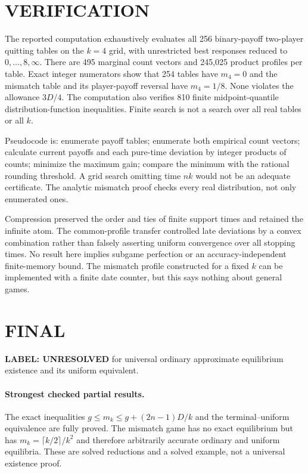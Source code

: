 \documentclass[11pt,a4paper]{article}
\theoremstyle{definition}
\theoremstyle{remark}
\begin{document}
\section{VERIFICATION}
The reported computation exhaustively evaluates all 256 binary-payoff two-player quitting tables on the $k=4$ grid, with unrestricted best responses reduced to $0,\ldots,8,\infty$. There are 495 marginal count vectors and 245,025 product profiles per table. Exact integer numerators show that 254 tables have $m_4=0$ and the mismatch table and its player-payoff reversal have $m_4=1/8$. None violates the allowance $3D/4$. The computation also verifies 810 finite midpoint-quantile distribution-function inequalities. Finite search is not a search over all real tables or all $k$.

Pseudocode is: enumerate payoff tables; enumerate both empirical count vectors; calculate current payoffs and each pure-time deviation by integer products of counts; minimize the maximum gain; compare the minimum with the rational rounding threshold. A grid search omitting time $nk$ would not be an adequate certificate. The analytic mismatch proof checks every real distribution, not only enumerated ones.

Compression preserved the order and ties of finite support times and retained the infinite atom. The common-profile transfer controlled late deviations by a convex combination rather than falsely asserting uniform convergence over all stopping times. No result here implies subgame perfection or an accuracy-independent finite-memory bound. The mismatch profile constructed for a fixed $k$ can be implemented with a finite date counter, but this says nothing about general games.

\section{FINAL}
\textbf{LABEL: UNRESOLVED} for universal ordinary approximate equilibrium existence and its uniform equivalent.

\paragraph{Strongest checked partial results.}
The exact inequalities $g\leq m_k\leq g+(2n-1)D/k$ and the terminal--uniform equivalence are fully proved. The mismatch game has no exact equilibrium but has $m_k=\lceil k/2\rceil/k^2$ and therefore arbitrarily accurate ordinary and uniform equilibria. These are solved reductions and a solved example, not a universal existence proof.
\end{document}

